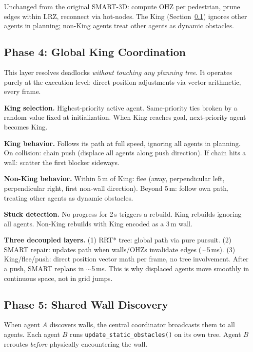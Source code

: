 \documentclass[letterpaper, 10pt, conference]{IEEEtran}
\newcommand{\smarttd}{SMART\nobreakdash-3D}
\begin{document}
Unchanged from the original \smarttd{}: compute OHZ per pedestrian, prune edges within LRZ, reconnect via hot-nodes. The King (Section~\ref{sec:king}) ignores other agents in planning; non-King agents treat other agents as dynamic obstacles.

\subsection{Phase 4: Global King Coordination}
\label{sec:king}

This layer resolves deadlocks \emph{without touching any planning tree}. It operates purely at the execution level: direct position adjustments via vector arithmetic, every frame.

\textbf{King selection.} Highest-priority active agent. Same-priority ties broken by a random value fixed at initialization. When King reaches goal, next-priority agent becomes King.

\textbf{King behavior.} Follows its path at full speed, ignoring all agents in planning. On collision: chain push (displace all agents along push direction). If chain hits a wall: scatter the first blocker sideways.

\textbf{Non-King behavior.} Within 5\,m of King: flee (away, perpendicular left, perpendicular right, first non-wall direction). Beyond 5\,m: follow own path, treating other agents as dynamic obstacles.

\textbf{Stuck detection.} No progress for 2\,s triggers a rebuild. King rebuilds ignoring all agents. Non-King rebuilds with King encoded as a 3\,m wall.

\textbf{Three decoupled layers.} (1) RRT* tree: global path via pure pursuit. (2) SMART repair: updates path when walls/OHZs invalidate edges (${\sim}$5\,ms). (3) King/flee/push: direct position vector math per frame, no tree involvement. After a push, SMART replans in ${\sim}$5\,ms. This is why displaced agents move smoothly in continuous space, not in grid jumps.

\subsection{Phase 5: Shared Wall Discovery}
\label{sec:phase5}

When agent $A$ discovers walls, the central coordinator broadcasts them to all agents. Each agent $B$ runs \texttt{update\_static\_obstacles()} on its own tree. Agent $B$ reroutes \emph{before} physically encountering the wall.
\end{document}
